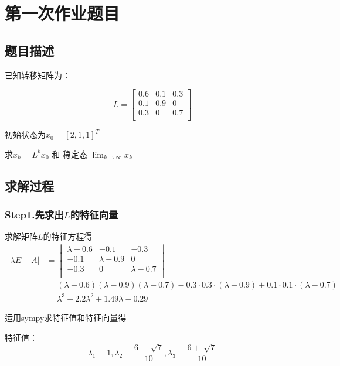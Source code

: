 \chapter{第一次作业题目}
\section{题目描述}
已知转移矩阵为：

\begin{equation}
    L = 
    \begin{bmatrix}
        0.6 & 0.1 & 0.3\\
        0.1 & 0.9 & 0\\
        0.3 & 0 & 0.7\\
    \end{bmatrix}
\end{equation}

初始状态为$x_0 = [2,1,1] ^ T$

求$x_k = L^k x_0$ 和 稳定态 $\displaystyle \lim_{k \to \infty} x_k$

\section{求解过程}

\subsection{Step1.先求出$L$的特征向量}

求解矩阵$L$的特征方程得
\begin{equation}
    \begin{split}  
   |\lambda E - A | &= 
   \begin{vmatrix}
    \lambda - 0.6 & -0.1 & -0.3\\
    -0.1 & \lambda - 0.9 & 0\\
    -0.3 & 0 & \lambda -0.7\\
   \end{vmatrix}
   \\
   &=(\lambda -0.6)(\lambda - 0.9)(\lambda-0.7)-0.3·0.3·(\lambda - 0.9) + 0.1·0.1·(\lambda - 0.7)\\
   &= \lambda ^ 3 - 2.2 \lambda ^ 2 + 1.49 \lambda - 0.29
\end{split}
\end{equation}

运用sympy求特征值和特征向量得

特征值：
\begin{equation}
\lambda_1 = 1, \lambda_2 =\frac{6-\sqrt[]{7}}{10}, \lambda_3 = \frac{6 + \sqrt[]{7}}{10}
\end{equation}

